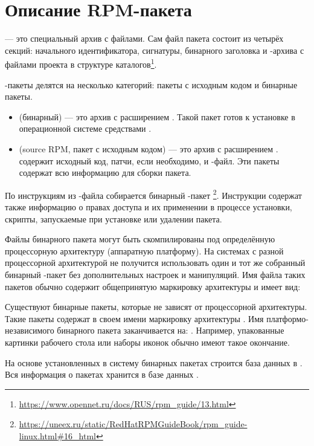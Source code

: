 \hypertarget{rpm-pack-desc}{\section{Описание RPM-пакета}}

 --- это специальный архив с файлами. Сам файл пакета состоит из четырёх секций:
начального идентификатора, сигнатуры, бинарного заголовка и -архива с файлами проекта в структуре
каталогов\footnote{\href{https://www.opennet.ru/docs/RUS/rpm_guide/13.html}{https://www.opennet.ru/docs/RUS/rpm\_guide/13.html}}.

-пакеты делятся на несколько категорий: пакеты с исходным кодом и бинарные пакеты.
\begin{itemize}
	\item {} (бинарный) --- это архив с расширением . Такой пакет готов к установке в
		операционной системе средствами .
	\item {} (source RPM, пакет с исходным кодом) --- это архив с расширением .
		 содержит исходный код, патчи, если необходимо, и -файл. Эти пакеты содержат
		всю информацию для сборки пакета.
\end{itemize}

По инструкциям из -файла собирается бинарный -пакет%
\footnote{\href{https://uneex.ru/static/RedHatRPMGuideBook/rpm_guide-linux.html\#16_html}{https://uneex.ru/static/RedHatRPMGuideBook/rpm\_guide-linux.html\#16\_html}}. Инструкции содержат также информацию о правах доступа и их применении в
процессе установки, скрипты, запускаемые при установке или удалении пакета.

Файлы бинарного пакета могут быть скомпилированы под определённую процессорную архитектуру (аппаратную платформу).
На системах с разной процессорной архитектурой не получится использовать один и тот же
собранный бинарный -пакет без дополнительных настроек и манипуляций.
Имя файла таких пакетов обычно содержит общепринятую маркировку архитектуры и имеет вид:

Существуют бинарные пакеты, которые не зависят от процессорной архитектуры. Такие пакеты содержат
в своем имени маркировку архитектуры . Имя платформо-независимого бинарного пакета
заканчивается на: . Например, упакованные картинки рабочего стола или наборы иконок
обычно имеют такое окончание.

На основе установленных в систему бинарных пакетах строится база данных в . Вся
информация о пакетах хранится в базе данных .

